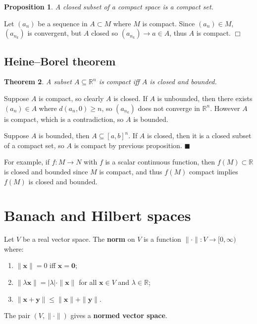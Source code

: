 \documentclass[letter-paper]{tufte-book}
\newtheorem{theorem}{\color{pastel-blue}Theorem}[section]
\newtheorem{proposition}[theorem]{\color{pastel-blue}Proposition}
\newenvironment{proof}[1][Proof]{\begin{trivlist}
\item[\hskip \labelsep {\bfseries #1}]}{\end{trivlist}}
\newcommand{\xb}{\boldsymbol{x}}
\newcommand{\yb}{\boldsymbol{y}}
\newcommand{\qed}{\hfill$\blacksquare$}
\newcommand{\qedwhite}{\hfill \ensuremath{\Box}}
\begin{document}
\begin{proposition}
  A closed subset of a compact space is a compact set.
\end{proposition}

\begin{proof}
  Let $(a_n)$ be a sequence in $A \subset M$ where $M$ is compact. Since $(a_n)
  \in M$, $(a_{n_k})$ is convergent, but $A$ closed so $(a_{n_k}) \to a \in A$,
  thus $A$ is compact. \qedwhite
\end{proof}

\subsection{Heine--Borel theorem}

\begin{theorem}
  A subset $A \subseteq \mathbb{R}^n$ is compact iff $A$ is closed and bounded.
\end{theorem}

\begin{proof}
  Suppose $A$ is compact, so clearly $A$ is closed. If $A$ is unbounded, then
  there exists $(a_n) \in A$ where $d(a_n, 0) \geq n$, so $(a_{n_k})$ does not
  converge in $\mathbb{R}^n$. However $A$ is compact, which is a contradiction,
  so $A$ is bounded.
  
  Suppose $A$ is bounded, then $A\subseteq [a,b]^n$. If $A$ is closed, then it
  is a closed subset of a compact set, so $A$ is compact by previous
  proposition. \qed
\end{proof}

For example, if $f: M \to N$ with $f$ is a scalar continuous function, then
$f(M) \subset \mathbb{R}$ is closed and bounded since $M$ is compact, and thus
$f(M)$ compact implies $f(M)$ is closed and bounded.


\section{Banach and Hilbert spaces}

Let $V$ be a real vector space. The \textbf{norm} on $V$ is a function
$\|\cdot\| : V \to [0, \infty)$ where:
\begin{enumerate}
  \item $\|\xb\| = 0$ iff $\xb = \boldsymbol{0}$;
  \item $\|\lambda \xb \| = |\lambda| \cdot \|\xb\|$ for all $\xb \in V$ and
  $\lambda \in \mathbb{R}$;
  \item $\|\xb + \yb\| \leq \|\xb\| + \|\yb\|$.
\end{enumerate}
The pair $\left(V, \| \cdot \|\right)$ gives a \textbf{normed vector space}.
\end{document}
